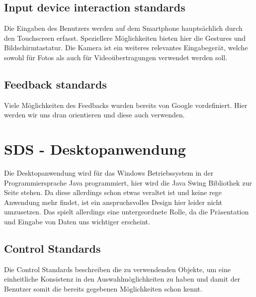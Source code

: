 \subsection{Input device interaction standards}
Die Eingaben des Benutzers werden auf dem Smartphone hauptsächlich durch den Touchscreen erfasst. Speziellere Möglichkeiten bieten hier die Gestures und Bildschirmtastatur. Die Kamera ist ein weiteres relevantes Eingabegerät, welche sowohl für Fotos als auch für Videoübertragungen verwendet werden soll.

\subsection{Feedback standards} 
Viele Möglichkeiten des Feedbacks wurden bereits von Google vordefiniert. Hier werden wir uns dran orientieren und diese auch verwenden. 

\section{SDS - Desktopanwendung}
Die Desktopanwendung wird für das Windows Betriebssystem in der Programmiersprache Java programmiert, hier wird die Java Swing Bibliothek zur Seite stehen. Da diese allerdings schon etwas veraltet ist und keine rege Anwendung mehr findet, ist ein anspruchsvolles Design hier leider nicht umzusetzen. Das spielt allerdings eine untergeordnete Rolle, da die Präsentation und Eingabe von Daten uns wichtiger erscheint.

\subsection{Control Standards}
Die Control Standards beschreiben die zu verwendenden Objekte, um eine einheitliche Konsistenz in den Auswahlmöglichkeiten zu haben und damit der Benutzer somit die bereits gegebenen Möglichkeiten schon kennt.

\begin{table}[]
\centering
\caption{Control Standards Desktopanwendung}
\label{cs_desktop}
\end{table}

